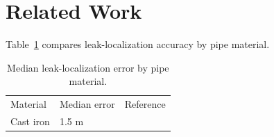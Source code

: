 
\section{Related Work}

Table~\ref{tab:localization} compares leak-localization accuracy by pipe material.

\begin{table}[h]
  \centering
  \caption{Median leak-localization error by pipe material.}
  \label{tab:localization}
  \begin{tabular}{lll}
    Material & Median error & Reference \\
    Cast iron & 1.5 m & \cite{alder2021leakage} \\
  \end{tabular}
\end{table}
